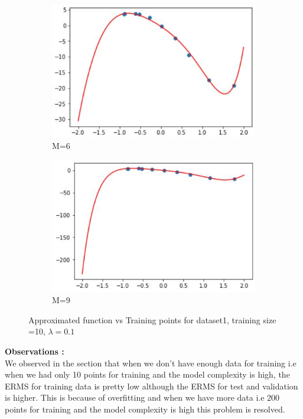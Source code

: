\documentclass[11pt]{article}
\begin{document}
\begin{figure}[h]
\centering
	\begin{subfigure}[b]{0.4\textwidth}
	\centering
	\includegraphics[scale=0.7]{dataset1_10_lambda1_m6funcplot.jpg}
	\caption{    M=6}
	\label{fig:fig1.2.1.1}
	\end{subfigure}
	\hfill
	\begin{subfigure}[b]{0.4\textwidth}
	\centering
	\includegraphics[scale=0.7]{dataset1_10_lambda1_m9funcplot.jpg}
	\caption{    M=9}
	\label{fig:fig1.2.1.2}
	\end{subfigure}
\caption{Approximated function vs Training points for dataset1, training size =10, $\lambda = 0.1$}
\label{fig:fig1.2.1}
\end{figure}

\textbf{Observations :}\\
We observed in the section that when we don't have enough data for training i.e when we had only 10 points for training and the model complexity is high, the ERMS for training data is pretty low although the ERMS for test and validation is higher. This is because of overfitting and when we have more data i.e 200 points for training and the model complexity is high this problem is resolved.
\newpage
\end{document}
